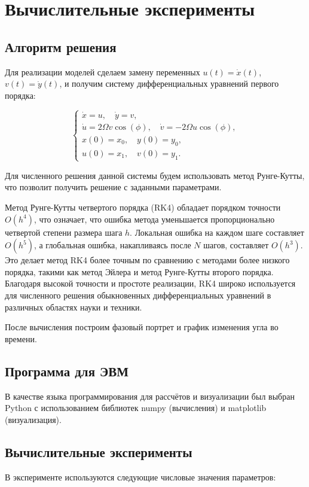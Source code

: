 \chapter{Вычислительные эксперименты}
\section{Алгоритм решения}

Для реализации моделей сделаем замену переменных \( u(t) = \dot{x}(t) \), \( v(t) = \dot{y}(t) \), и получим систему дифференциальных уравнений первого порядка:

\[
\begin{cases}
	\dot{x} = u, \quad \dot{y} = v, \\
	\dot{u} = 2\Omega v\cos(\phi), \quad \dot{v} = -2\Omega u\cos(\phi), \\
	x(0) = x_0, \quad y(0) = y_0, \\
	u(0) = x_1, \quad v(0) = y_1.
\end{cases}
\]

Для численного решения данной системы будем использовать метод Рунге-Кутты\cite{1964calculus}, что позволит получить решение с заданными параметрами. 

Метод Рунге-Кутты четвертого порядка (RK4) обладает порядком точности \( O(h^4) \), что означает, что ошибка метода уменьшается пропорционально четвертой степени размера шага \( h \). Локальная ошибка на каждом шаге составляет \( O(h^5) \), а глобальная ошибка, накапливаясь после \( N \) шагов, составляет \( O(h^3) \). Это делает метод RK4 более точным по сравнению с методами более низкого порядка, такими как метод Эйлера и метод Рунге-Кутты второго порядка. Благодаря высокой точности и простоте реализации, RK4 широко используется для численного решения обыкновенных дифференциальных уравнений в различных областях науки и техники.


После вычисления построим фазовый портрет и график изменения угла во времени.

\section{Программа для ЭВМ}
В качестве языка программирования для рассчётов и визуализации был выбран Python с использованием библиотек numpy (вычисления) и matplotlib (визуализация).

 

\section{Вычислительные эксперименты}
В эксперименте используются следующие числовые значения параметров:

